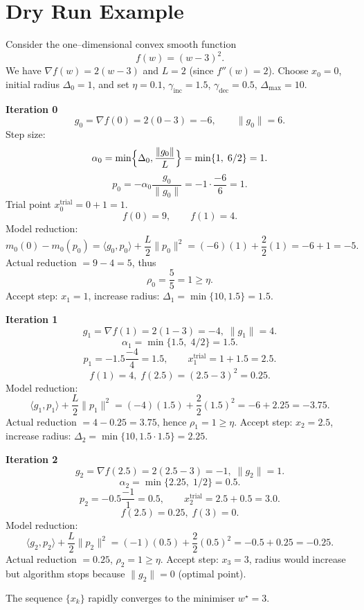 \documentclass{article}
\begin{document}
\section*{Dry Run Example}
Consider the one–dimensional convex smooth function
\[
f(w)=(w-3)^2 .
\]
We have $\nabla f(w)=2(w-3)$ and $L=2$ (since $f''(w)=2$).  
Choose $x_0=0$, initial radius $\Delta_0=1$, and set $\eta=0.1$, $\gamma_{\text{inc}}=1.5$, $\gamma_{\text{dec}}=0.5$, $\Delta_{\max}=10$.

\medskip
\noindent\textbf{Iteration 0}
\[
g_0=\nabla f(0)=2(0-3)=-6,\qquad \|g_0\|=6.
\]
Step size:
\[
\alpha_0=\min\Bigl\{\Delta_0,\frac{\|g_0\|}{L}\Bigr\}
       =\min\{1,\;6/2\}=1.
\]
\[
p_0=-\alpha_0\frac{g_0}{\|g_0\|}= -1\cdot\frac{-6}{6}=1.
\]
Trial point $x_0^{\text{trial}}=0+1=1$.
\[
f(0)=9,\qquad f(1)=4.
\]
Model reduction:
\[
m_0(0)-m_0(p_0)=\langle g_0,p_0\rangle+\frac{L}{2}\|p_0\|^2
               =(-6)(1)+\frac{2}{2}(1)= -6+1=-5.
\]
Actual reduction $=9-4=5$, thus
\[
\rho_0=\frac{5}{5}=1\ge\eta .
\]
Accept step: $x_1=1$, increase radius: $\Delta_1=\min\{10,1.5\}=1.5$.

\medskip
\noindent\textbf{Iteration 1}
\[
g_1=\nabla f(1)=2(1-3)=-4,\;\|g_1\|=4.
\]
\[
\alpha_1=\min\{1.5,\;4/2\}=1.5.
\]
\[
p_1=-1.5\frac{-4}{4}=1.5,\qquad x_1^{\text{trial}}=1+1.5=2.5.
\]
\[
f(1)=4,\; f(2.5)=(2.5-3)^2=0.25.
\]
Model reduction:
\[
\langle g_1,p_1\rangle+\frac{L}{2}\|p_1\|^2=(-4)(1.5)+\frac{2}{2}(1.5)^2=-6+2.25=-3.75.
\]
Actual reduction $=4-0.25=3.75$, hence $\rho_1=1\ge\eta$.
Accept step: $x_2=2.5$, increase radius: $\Delta_2=\min\{10,1.5\cdot1.5\}=2.25$.

\medskip
\noindent\textbf{Iteration 2}
\[
g_2=\nabla f(2.5)=2(2.5-3)=-1,\;\|g_2\|=1.
\]
\[
\alpha_2=\min\{2.25,\;1/2\}=0.5.
\]
\[
p_2=-0.5\frac{-1}{1}=0.5,\qquad x_2^{\text{trial}}=2.5+0.5=3.0.
\]
\[
f(2.5)=0.25,\; f(3)=0.
\]
Model reduction:
\[
\langle g_2,p_2\rangle+\frac{L}{2}\|p_2\|^2=(-1)(0.5)+\frac{2}{2}(0.5)^2=-0.5+0.25=-0.25.
\]
Actual reduction $=0.25$, $\rho_2=1\ge\eta$.
Accept step: $x_3=3$, radius would increase but algorithm stops because $\|g_2\|=0$ (optimal point).

The sequence $\{x_k\}$ rapidly converges to the minimiser $w^\star=3$.

\newpage
\end{document}

